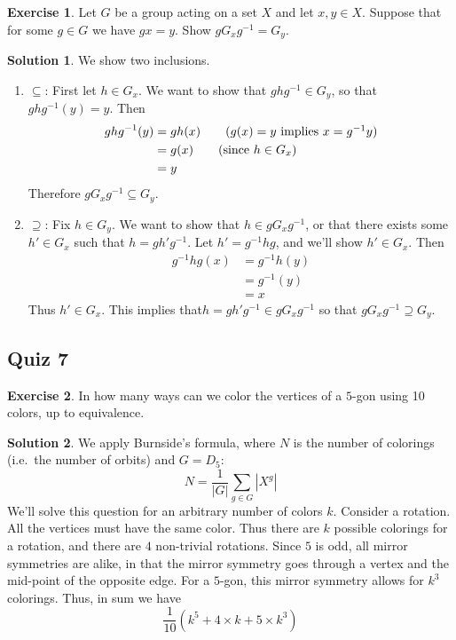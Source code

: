 \documentclass[12pt]{article}
\theoremstyle{definition}
\newtheorem{exercise}{\color{YellowOrange}Exercise}
\theoremstyle{definition}
\newtheorem{solution}{\color{Goldenrod}Solution}
\begin{document}
\begin{exercise}
	Let $G$ be a group acting on a set $X$ and let $x,y \in X$. Suppose that for some $g \in G$ we have $gx = y$. Show $gG_xg^{-1} = G_y$.
\end{exercise}
\begin{solution}
	We show two inclusions.
	\begin{enumerate}
		\item $\subseteq$: First let $h \in G_x$. We want to show that $ghg^{-1} \in G_y$, so that $ghg^{-1}(y) = y$.  Then
		\begin{align*}
			ghg^{-1}(y) &= gh(x) \tag{$g(x) = y$ implies $x = g^{-1}y$} \\
			&= g(x) \tag{since $h \in G_x$} \\
			&= y 
		\end{align*}
		Therefore $gG_xg^{-1} \subseteq G_y$.
		\item $\supseteq$: Fix $h \in G_y$. We want to show that $h \in gG_xg^{-1}$, or that there exists some $h' \in G_x$ such that $h = gh'g^{-1}$. Let $h' = g^{-1}hg$, and we'll show $h' \in G_x$. Then
		\begin{align*}
			g^{-1}hg(x) &= g^{-1}h(y) \\
			&= g^{-1}(y) \tag{since $h \in G_y$} \\
			&= x
		\end{align*}
		Thus $h' \in G_x$. This implies that$h = gh'g^{-1} \in gG_xg^{-1}$ so that $gG_xg^{-1} \supseteq G_y$. 
	\end{enumerate}
\end{solution}

\subsection{Quiz 7}
\begin{exercise}
	In how many ways can we color the vertices of a $5$-gon using 10 colors, up to equivalence. 
\end{exercise}
\begin{solution}
	We apply Burnside's formula, where $N$ is the number of colorings (i.e.\ the number of orbits) and $G = D_5$:
	\begin{equation}
		N = \frac{1}{|G|} \sum_{g\in G} |X^g|
	\end{equation}
	We'll solve this question for an arbitrary number of colors $k$. Consider a rotation. All the vertices must have the same color. Thus there are $k$ possible colorings for a rotation, and there are $4$ non-trivial rotations. Since $5$ is odd, all mirror symmetries are alike, in that the mirror symmetry goes through a vertex and the mid-point of the opposite edge. For a $5$-gon, this mirror symmetry allows for $k^3$ colorings. Thus, in sum we have
	\begin{equation}
		\frac{1}{10}(k^5 + 4 \times k + 5 \times k^3)
	\end{equation}
\end{solution}
\end{document}
